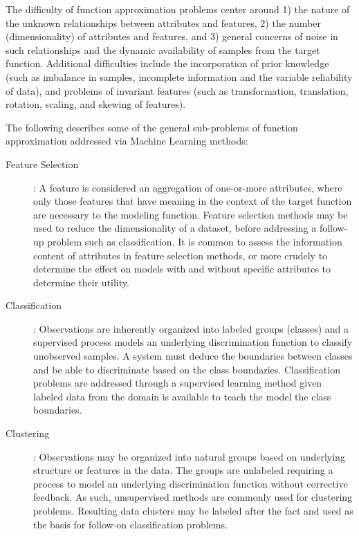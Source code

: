 The difficulty of function approximation problems center around 1) the nature of the unknown relationships between attributes and features, 2) the number (dimensionality) of attributes and features, and 3) general concerns of noise in such relationships and the dynamic availability of samples from the target function.
Additional difficulties include the incorporation of prior knowledge (such as imbalance in samples, incomplete information and the variable reliability of data), and problems of invariant features (such as transformation, translation, rotation, scaling, and skewing of features).

The following describes some of the general sub-problems of function approximation addressed via Machine Learning methods:

\begin{description}
	\item[Feature Selection]: A feature is considered an aggregation of one-or-more attributes, where only those features that have meaning in the context of the target function are necessary to the modeling function. Feature selection methods may be used to reduce the dimensionality of a dataset, before addressing a follow-up problem such as classification. It is common to assess the information content of attributes in feature selection methods, or more crudely to determine the effect on models with and without specific attributes to determine their utility.
	
	\item[Classification]: Observations are inherently organized into labeled groups (classes) and a supervised process models an underlying discrimination function to classify unobserved samples. A system must deduce the boundaries between classes and be able to discriminate based on the class boundaries. Classification problems are addressed through a supervised learning method given labeled data from the domain is available to teach the model the class boundaries. 
	
	\item[Clustering]: Observations may be organized into natural groups based on underlying structure or features in the data. The groups are unlabeled requiring a process to model an underlying discrimination function without corrective feedback. As such, unsupervised methods are commonly used for clustering problems. Resulting data clusters may be labeled after the fact and used as the basis for follow-on classification problems.
	

\end{description}
